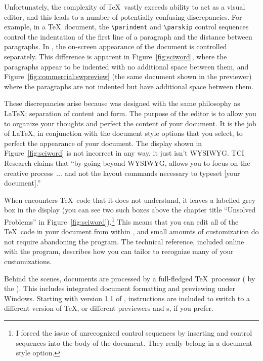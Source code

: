 Unfortunately, the complexity of \TeX\ vastly exceeds
 ability to act as a visual editor, and this
leads to a number of potentially confusing discrepancies.  For
example, in a \TeX\ document, the \verb|\parindent| and
\verb|\parskip| control sequences control the indentation of the
first line of a paragraph and the distance between paragraphs.  In
, the on-screen appearance of the document is
controlled separately.  This difference is apparent in
Figure~\ref{fig:sciword}, where the paragraphs appear to be indented with
no additional space between them, and Figure~\ref{fig:commercial:swpreview}
(the same document shown in the previewer) where the paragraphs are not
indented but have additional space between them.

These discrepancies arise because  was designed with
the same philosophy as \LaTeX: separation of content and form.  The purpose of
the  editor is to allow you to organize your thoughts
and perfect the content of your document.  It is the job of \LaTeX, in
conjunction with the document style options that you select, to perfect the
appearance of your document.  The display shown in Figure~\ref{fig:sciword} is
not incorrect in any way, it just isn't WYSIWYG.  TCI Research claims that
``by going beyond WYSIWYG,  allows you to focus on
the creative process~$\ldots$ and not the layout commands necessary to typeset
[your document].''


When  encounters \TeX\ code that it does not
understand, it leaves a labelled grey box in the display (you can see two such
boxes above the chapter title ``Unsolved Problems'' in
Figure~\ref{fig:sciword}).\footnote{I forced the issue of unrecognized control
sequences by inserting  and  control sequences into
the body of the document.  They really belong in a document style option.}
This means that you can edit all of the \TeX\ code in your document from
within , and small amounts of customization do not
require abandoning the program.  The  technical
reference, included online with the program, describes how you can tailor
 to recognize many of your customizations.

Behind the scenes,  documents are processed by
a full-fledged \TeX\ processor ( by the
).
This includes integrated document formatting and previewing under Windows.
Starting with version 1.1 of , instructions are
included to switch to a different version of \TeX, or different previewers
and \dvidriver{}s, if you prefer.

